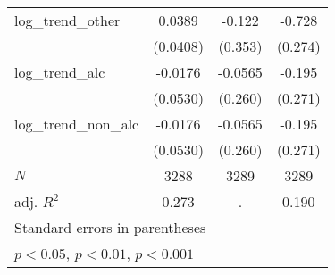 {\begin{tabular}{l*{3}{c}}
\hline
log\_trend\_other&      0.0389         &      -0.122         &      -0.728\sym{**} \\
            &    (0.0408)         &     (0.353)         &     (0.274)         \\
\hline
log\_trend\_alc&     -0.0176         &     -0.0565         &      -0.195         \\
            &    (0.0530)         &     (0.260)         &     (0.271)         \\
\hline
log\_trend\_non\_alc&     -0.0176         &     -0.0565         &      -0.195         \\
            &    (0.0530)         &     (0.260)         &     (0.271)         \\
\hline
\(N\)       &        3288         &        3289         &        3289         \\
adj. \(R^{2}\)&       0.273         &           .         &       0.190         \\
\hline\hline
\multicolumn{4}{l}{\footnotesize Standard errors in parentheses}\\
\multicolumn{4}{l}{\footnotesize \sym{*} \(p<0.05\), \sym{**} \(p<0.01\), \sym{***} \(p<0.001\)}\\
\end{tabular}
}
